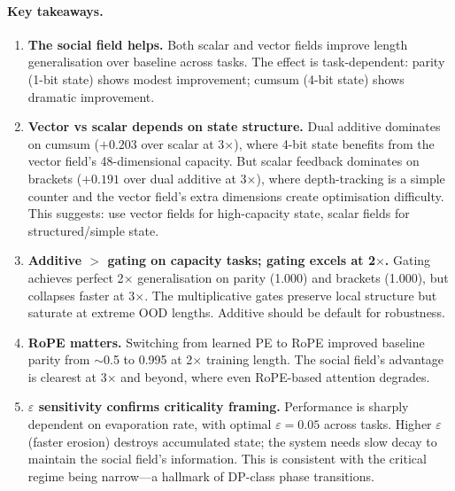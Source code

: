\documentclass[11pt,a4paper]{article}
\begin{document}
\paragraph{Key takeaways.}
\begin{enumerate}
    \item \textbf{The social field helps.}  Both scalar and vector
          fields improve length generalisation over baseline across
          tasks.  The effect is task-dependent: parity (1-bit state)
          shows modest improvement; cumsum (4-bit state) shows
          dramatic improvement.

    \item \textbf{Vector vs scalar depends on state structure.}
          Dual additive dominates on cumsum ($+0.203$ over scalar at
          3$\times$), where 4-bit state benefits from the vector
          field's 48-dimensional capacity.  But scalar feedback
          dominates on brackets ($+0.191$ over dual additive at
          3$\times$), where depth-tracking is a simple counter and
          the vector field's extra dimensions create optimisation
          difficulty.  This suggests: use vector fields for
          high-capacity state, scalar fields for structured/simple
          state.

    \item \textbf{Additive $>$ gating on capacity tasks; gating
          excels at 2$\times$.}  Gating achieves perfect 2$\times$
          generalisation on parity (1.000) and brackets (1.000),
          but collapses faster at 3$\times$.  The multiplicative
          gates preserve local structure but saturate at extreme
          OOD lengths.  Additive should be default for robustness.

    \item \textbf{RoPE matters.}  Switching from learned PE to RoPE
          improved baseline parity from $\sim$0.5 to 0.995 at
          2$\times$ training length.  The social field's advantage
          is clearest at 3$\times$ and beyond, where even RoPE-based
          attention degrades.

    \item \textbf{$\varepsilon$ sensitivity confirms criticality
          framing.}  Performance is sharply dependent on evaporation
          rate, with optimal $\varepsilon = 0.05$ across tasks.
          Higher $\varepsilon$ (faster erosion) destroys accumulated
          state; the system needs slow decay to maintain the social
          field's information.  This is consistent with the critical
          regime being narrow---a hallmark of DP-class phase
          transitions.
\end{enumerate}
\end{document}
